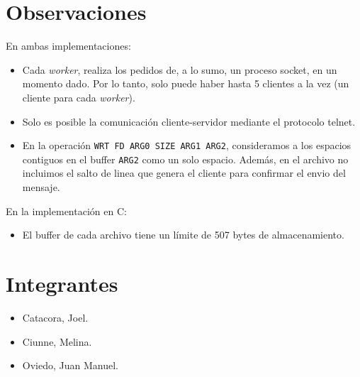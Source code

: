 \documentclass[a4paper, 8pt]{article}
\begin{document}
\section{Observaciones}

En ambas implementaciones:

\begin{itemize}

% 
  \item Cada \textit{worker}, realiza los pedidos de, a lo sumo, un proceso socket, en un momento dado. Por lo tanto, solo puede haber
  hasta 5 clientes a la vez (un cliente para cada \textit{worker}).

  \item Solo es posible la comunicación cliente-servidor mediante el protocolo telnet.
  
  \item En la operación \texttt{WRT FD ARG0 SIZE ARG1 ARG2}, consideramos a los espacios contiguos en el buffer \texttt{ARG2}
  como un solo espacio. Además, en el archivo no incluimos el salto de linea que genera el cliente para confirmar el envio del mensaje.
  
\end{itemize}

En la implementación en C:

\begin{itemize}
  \item El buffer de cada archivo tiene un límite de 507 bytes de almacenamiento.
  
\end{itemize}

\section{Integrantes}
\begin{itemize}
  \item Catacora, Joel.
  \item Ciunne, Melina.
  \item Oviedo, Juan Manuel.
\end{itemize}
\end{document}
